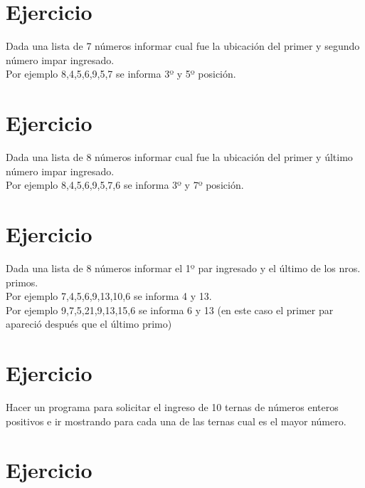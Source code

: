 \documentclass[12pt,a4paper,twoside]{article}
\begin{document}
\newpage

\section{Ejercicio }

\hspace*{1cm}Dada una lista de 7 números informar cual fue la ubicación del primer y segundo número impar ingresado.\\
Por ejemplo  8,4,5,6,9,5,7 se informa 3º y 5º posición. 

\newpage

\section{Ejercicio }

\hspace*{1cm}Dada una lista de 8 números informar cual fue la ubicación del primer y último número impar ingresado.\\
Por ejemplo  8,4,5,6,9,5,7,6 se informa 3º y 7º posición.

\newpage

\section{Ejercicio }

\hspace*{1cm}Dada una lista de 8 números informar el 1º par ingresado y el último de los nros. primos. \\
Por ejemplo  7,4,5,6,9,13,10,6 se informa  4 y 13.\\
Por ejemplo  9,7,5,21,9,13,15,6 se informa  6 y 13 (en este caso el primer par apareció después que el último primo) 

\newpage
\section{Ejercicio }

\hspace*{1cm}Hacer un programa para solicitar el ingreso de 10 ternas de números enteros positivos e ir mostrando para cada una de las ternas cual es el mayor número. 

\newpage

\section{Ejercicio }
\end{document}
